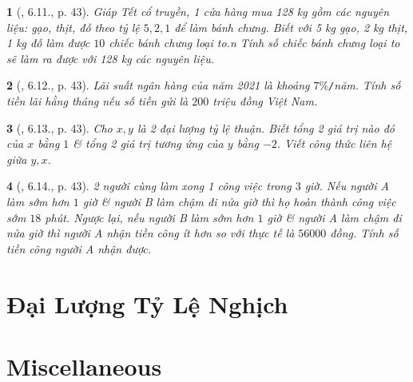 \documentclass{article}
\newtheorem{baitoan}{}
\begin{document}
\begin{baitoan}[\cite{Binh_boi_duong_Toan_7_tap_1}, 6.11., p. 43]
	Giáp Tết cổ truyền, 1 cửa hàng mua {\rm128 kg} gồm các nguyên liệu: gạo, thịt, đỗ theo tỷ lệ $5,2,1$ để làm bánh chưng. Biết với {\rm5 kg} gạo, {\rm2 kg} thịt, {\rm1 kg} đỗ làm được $10$ chiếc bánh chưng loại to.n Tính số chiếc bánh chưng loại to sẽ làm ra được với {\rm128 kg} các nguyên liệu.
\end{baitoan}

\begin{baitoan}[\cite{Binh_boi_duong_Toan_7_tap_1}, 6.12., p. 43]
	Lãi suất ngân hàng của năm 2021 là khoảng $7\%${\tt/}năm. Tính số tiền lãi hằng tháng nếu số tiền gửi là $200$ triệu đồng Việt Nam.
\end{baitoan}

\begin{baitoan}[\cite{Binh_boi_duong_Toan_7_tap_1}, 6.13., p. 43]
	Cho $x,y$ là 2 đại lượng tỷ lệ thuận. Biết tổng 2 giá trị nào đó của $x$ bằng $1$ \& tổng 2 giá trị tương ứng của $y$ bằng $-2$. Viết công thức liên hệ giữa $y,x$.
\end{baitoan}

\begin{baitoan}[\cite{Binh_boi_duong_Toan_7_tap_1}, 6.14., p. 43]
	2 người cùng làm xong 1 công việc trong $3$ giờ. Nếu người A làm sớm hơn $1$ giờ \& người B làm chậm đi nửa giờ thì họ hoàn thành công việc sớm $18$ phút. Ngược lại, nếu người B làm sớm hơn $1$ giờ \& người A làm chậm đi nửa giờ thì người A nhận tiền công ít hơn so với thực tế là $56000$ đồng. Tính số tiền công người A nhận được.
\end{baitoan}


\section{Đại Lượng Tỷ Lệ Nghịch}


\section{Miscellaneous}


\printbibliography[heading=bibintoc]
	
\end{document}
